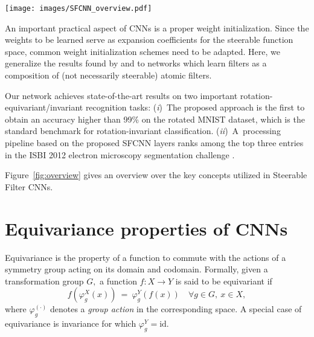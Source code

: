 \documentclass[10pt,twocolumn,letterpaper]{article}
\newcommand{\id}{\mathrm{id}}
\begin{document}
\begin{figure*}[t]
	\centering
	\texttt{[image: images/SFCNN\_overview.pdf]}
	\caption{
		Key concepts of the proposed Steerable Filter CNN:
		The filters are parameterized in a steerable function space with shared weights over filter orientations.
		Exact filter rotations are achieved by a phase manipulation of the expansion coefficients $w_q.$
		All layers are designed to be jointly translation and rotation equivariant.
		The weights $w_q$ serve as expansion coefficients of a fixed filter basis $\{\psi_q\}_{q}$ rather than pixel values.
		Therefore, we adapt He's weight initialization scheme to this more general case which implies to normalize the basis filter energies.
	}
	\vspace*{-2.5ex}
	\label{fig:overview}
\end{figure*}

An important practical aspect of CNNs is a proper weight initialization.
Since the weights to be learned serve as expansion coefficients for the steerable function space, common weight initialization schemes need to be adapted.
Here, we generalize the results found by \citet{Glorot10understandingthe} and \citet{DBLP:journals/corr/HeZR015} to networks which learn filters as a composition of (not necessarily steerable) atomic filters.

Our network achieves state-of-the-art results on two important rotation-equivariant/invariant recognition tasks:
(\emph{i})~The proposed approach is the first to obtain an accuracy higher than 99\% on the rotated MNIST dataset, which is the standard benchmark for rotation-invariant classification.
(\emph{ii})~A~processing pipeline based on the proposed \mbox{SFCNN} layers ranks among the top three entries in the ISBI 2012 electron microscopy segmentation challenge \cite{arganda2015crowdsourcing}.

Figure~\ref{fig:overview} gives an overview over the key concepts utilized in Steerable Filter \mbox{CNNs}.



\section{Equivariance properties of CNNs}

Equivariance is the property of a function to commute with the actions of a symmetry group acting on its domain and codomain.
Formally, given a transformation group $G,$ a function $f:X\to Y$ is said to be equivariant if
\begin{equation*}
	f\left(\varphi_g^X (x)\right)\ =\ \varphi_g^Y \left(f\left(x\right)\right) \quad \forall g\in G,\ x\in X,
\end{equation*}
where $\varphi_g^{(\cdot)}$ denotes a \emph{group action} in the corresponding space.
A special case of equivariance is invariance for which $\varphi_g^Y=\id$.
\end{document}

